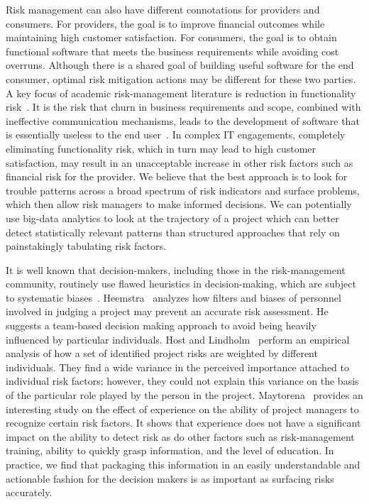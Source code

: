 Risk management can also have different connotations for provi\-ders and
consumers. For providers, the goal is to improve financial outcomes while
maintaining high customer satisfaction. For consumers, the goal is to obtain
functional software that meets the business requirements while avoiding cost
overruns. Although there is a shared goal of building useful software for the
end consumer, optimal risk mitigation actions may be different for these two
parties. A key focus of academic risk-management literature is reduction in
functionality risk~\cite{risk11}.  It is the risk that churn in business
requirements and scope, combined with ineffective communication mechanisms,
leads to the development of software that is essentially useless to the end
user~\cite{risk12}. In complex IT engagements, completely eliminating
functionality risk, which in turn may lead to high customer satisfaction, may
result in an unacceptable increase in other risk factors such as financial risk
for the provider. We believe that the best approach is to look for trouble
patterns across a broad spectrum of risk indicators and surface problems, which
then allow risk managers to make informed decisions. We can potentially use
big-data analytics to look at the trajectory of a project which can better
detect statistically relevant patterns than structured approaches that rely on
painstakingly tabulating risk factors.

It is well known that decision-makers, including those in the risk-management
community, routinely use flawed heuristics in decision-making, which are subject
to systematic biases~\cite{risk27}. Heemstra~\cite{risk24} analyzes how filters
and biases of personnel involved in judging a project may prevent an accurate
risk assessment. He suggests a team-based decision making approach to avoid
being heavily influenced by particular individuals. Host and
Lindholm~\cite{risk25} perform an empirical analysis of how a set of identified
project risks are weighted by different individuals. They find a wide variance
in the perceived importance attached to individual risk factors; however, they
could not explain this variance on the basis of the particular role played by
the person in the project. Maytorena~\cite{risk26} provides an interesting study
on the effect of experience on the ability of project managers to recognize
certain risk factors. It shows that experience does not have a significant
impact on the ability to detect risk as do other factors such as risk-management
training, ability to quickly grasp information, and the level of education. In
practice, we find that packaging this information in an easily understandable
and actionable fashion for the decision makers is as important as surfacing
risks accurately.

